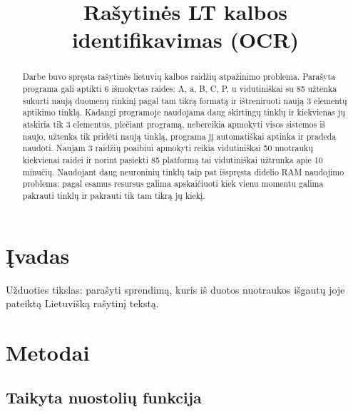 \documentclass[conference]{IEEEtran}
\begin{document}
\title{Rašytinės LT kalbos identifikavimas (OCR)}

\author{
}

\maketitle

\begin{abstract}
Darbe buvo spręsta rašytinės lietuvių kalbos raidžių atpažinimo problema.
Parašyta programa gali aptikti 6 išmokytas raides: A, a, B, C, P, u vidutiniškai su
85%
užtenka sukurti naują duomenų rinkinį pagal tam tikrą formatą ir ištreniruoti naują
3 elementų aptikimo tinklą. Kadangi programoje naudojama daug skirtingų tinklų ir kiekvienas
jų atskiria tik 3 elementus, plečiant programą, nebereikia apmokyti visos sistemos iš naujo,
užtenka tik pridėti naują tinklą, programa jį automatiškai aptinka ir pradeda naudoti.
Naujam 3 raidžių poaibiui apmokyti reikia vidutiniškai 50 nuotraukų kiekvienai raidei ir
norint pasiekti 85%
platformą tai vidutiniškai užtrunka apie 10 minučių. Naudojant daug neuroninių tinklų
taip pat išspręsta didelio RAM naudojimo problema: pagal esamus resursus galima
apskaičiuoti kiek vienu momentu galima pakrauti tinklų ir pakrauti tik tam tikrą jų
kiekį.
\end{abstract}

\section{Įvadas}
Užduoties tikslas: parašyti sprendimą, kuris iš duotos
nuotraukos išgautų joje pateiktą Lietuvišką rašytinį tekstą.

\section{Metodai}

\subsection{Taikyta nuostolių funkcija}
\end{document}

